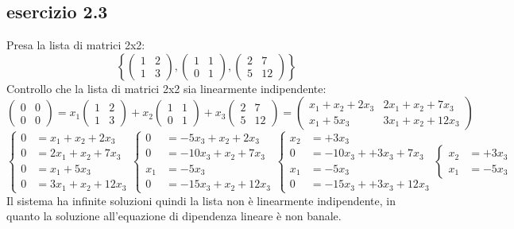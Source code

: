 \documentclass[a4paper,12pt]{article}
\begin{document}
	\subsection{esercizio 2.3}
	Presa la lista di matrici 2x2:
	\[\left\{\begin{pmatrix} 1 & 2 \\ 1 & 3 \end{pmatrix}, \begin{pmatrix} 1 & 1 \\ 0 & 1 \end{pmatrix}, \begin{pmatrix} 2 & 7 \\ 5 & 12 \end{pmatrix}\right\}\]
	Controllo che la lista di matrici 2x2 sia linearmente indipendente:
	\[\begin{pmatrix} 0 & 0 \\ 0 & 0 \end{pmatrix} = x_1 \begin{pmatrix} 1 & 2 \\ 1 & 3 \end{pmatrix} + x_2 \begin{pmatrix} 1 & 1 \\ 0 & 1 \end{pmatrix} + x_3 \begin{pmatrix} 2 & 7 \\ 5 & 12 \end{pmatrix} = \begin{pmatrix} x_1 + x_2 + 2x_3 & 2x_1 + x_2 + 7x_3 \\ x_1 + 5x_3 & 3x_1 + x_2 + 12x_3 \end{pmatrix}\]
	\[\left\{\begin{aligned}
		0 & = x_1 + x_2 + 2x_3 \\
		0 & = 2x_1 + x_2 + 7x_3\\
		0 & = x_1 + 5x_3\\
		0 & = 3x_1 + x_2 + 12x_3
	\end{aligned}\right.
	\left\{\begin{aligned}
		0 & = -5x_3 + x_2 + 2x_3 \\
		0 & = -10x_3 + x_2 + 7x_3\\
		x_1 & = -5x_3\\
		0 & = -15x_3 + x_2 + 12x_3
	\end{aligned}\right.
	\left\{\begin{aligned}
	x_2 & = +3x_3 \\
	0 & = -10x_3 + +3x_3 + 7x_3\\
	x_1 & = -5x_3\\
	0 & = -15x_3 + +3x_3 + 12x_3
	\end{aligned}\right.
	\left\{\begin{aligned}
	x_2 & = +3x_3 \\
	x_1 & = -5x_3
	\end{aligned}\right.\]
	Il sistema ha infinite soluzioni quindi la lista non è linearmente indipendente, in quanto la soluzione all'equazione di dipendenza lineare è non banale.
	
\end{document}
